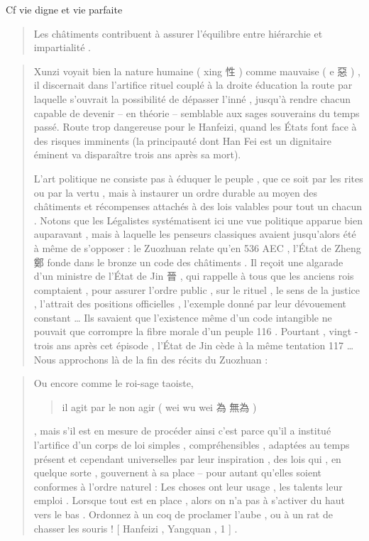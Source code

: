 Cf vie digne et vie parfaite

 \begin{quote}

Les châtiments contribuent à assurer l'équilibre entre hiérarchie et
impartialité .

\end{quote}  \begin{quote}

Xunzi voyait bien la nature humaine ( xing 性 ) comme mauvaise ( e 惡 )
, il discernait dans l'artifice rituel couplé à la droite éducation la
route par laquelle s'ouvrait la possibilité de dépasser l'inné , jusqu'à
rendre chacun capable de devenir -- en théorie -- semblable aux sages souverains du temps passé. Route trop dangereuse pour le Hanfeizi, quand les États font face à des risques imminents (la principauté dont Han Fei est un dignitaire éminent va disparaître trois ans après sa mort).
 
L'art politique ne consiste pas à éduquer le peuple , que ce soit par
les rites ou par la vertu , mais à instaurer un ordre durable au moyen
des châtiments et récompenses attachés à des lois valables pour tout un
chacun . Notons que
les Légalistes systématisent ici une vue politique apparue bien
auparavant , mais à laquelle les penseurs classiques avaient jusqu'alors
été à même de s'opposer : le Zuozhuan relate qu'en 536 AEC , l'État de
Zheng 鄭 fonde dans le bronze un code des châtiments . Il reçoit une
algarade d'un ministre de l'État de Jin 晉 , qui rappelle à tous que les
anciens rois comptaient , pour assurer l'ordre public , sur le rituel ,
le sens de la justice , l'attrait des positions officielles , l'exemple
donné par leur dévouement constant \ldots{} Ils savaient que l'existence
même d'un code intangible ne pouvait que corrompre la fibre morale d'un
peuple 116 . Pourtant , vingt - trois ans après cet épisode , l'État de
Jin cède à la même tentation 117 \ldots{} Nous approchons là de la fin
des récits du Zuozhuan :

\end{quote}  \begin{quote}
Ou encore comme le roi-sage taoiste,  \begin{quote}
    il
agit par le non agir ( wei wu wei 為 無為 ) 
\end{quote}, mais s'il est en mesure
de procéder ainsi c'est parce qu'il a institué l'artifice d'un corps de
loi simples , compréhensibles , adaptées au temps présent et cependant
universelles par leur inspiration , des lois qui , en quelque sorte ,
gouvernent à sa place -- pour autant qu'elles soient conformes à l'ordre
naturel : Les choses ont leur usage , les talents leur emploi . Lorsque
tout est en place , alors on n'a pas à s'activer du haut vers le bas .
Ordonnez à un coq de proclamer l'aube , ou à un rat de chasser les
souris ! {[} Hanfeizi , Yangquan , 1 {]} .


\end{quote}
